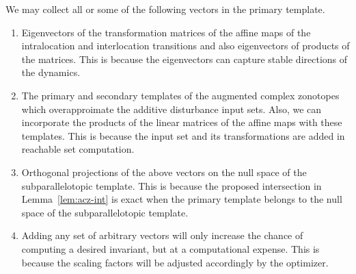   We may collect all or some of
the following vectors in the primary template.
%
\begin{enumerate}
\item Eigenvectors of the transformation matrices of the affine maps
  of the intralocation and interlocation transitions and also
  eigenvectors of products of the matrices.  This is because the
  eigenvectors can capture stable directions of the dynamics.
\item The primary and secondary templates of the augmented complex
  zonotopes which overapproimate the additive disturbance input sets.
  Also, we can incorporate the products of the linear matrices of the
  affine maps with these templates.  This is because the input set and
  its transformations are added in reachable set
  computation.
\item Orthogonal projections of the above vectors on the null
  space of the subparallelotopic template.  This is because the
  proposed intersection in Lemma~\ref{lem:acz-int} is exact when the
  primary template belongs to the null space of the subparallelotopic
  template.
\item Adding any set of arbitrary vectors will only increase the chance of computing a desired
  invariant, but at a computational expense.  This is because the
  scaling factors will be adjusted accordingly by the optimizer. 
\end{enumerate}
